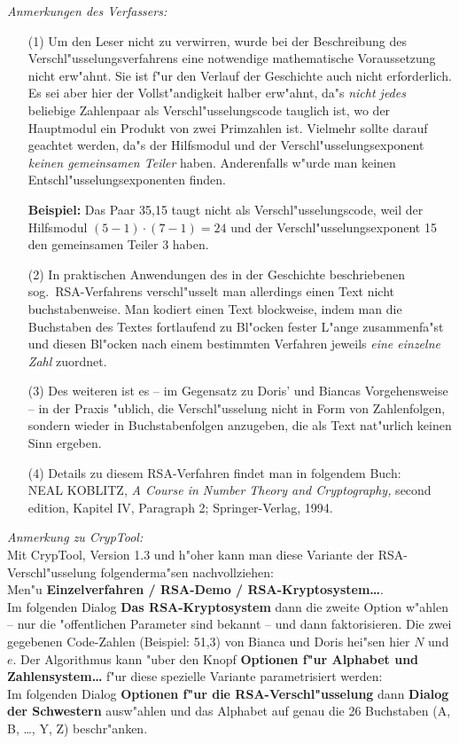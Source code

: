 \[\]
\[\]
\[\]
\[\]
\hrulefill
\[\]
\[\]
\emph{Anmerkungen des Verfassers:}
\begin{itemize}
\item[(1)] Um den Leser nicht zu verwirren, wurde bei der Beschreibung des
  Verschl"usselungsverfahrens eine notwendige mathematische Voraussetzung
  nicht erw"ahnt. Sie ist f"ur den Verlauf der Geschichte auch nicht
  erforderlich. Es sei aber hier der Vollst"andigkeit halber erw"ahnt, da"s
  \emph{nicht jedes} beliebige Zahlenpaar als Verschl"usselungscode
  tauglich ist, wo der Hauptmodul ein Produkt von zwei Primzahlen
  ist. Vielmehr sollte darauf geachtet werden, da"s der Hilfsmodul und der
  Verschl"usselungsexponent \emph{keinen gemeinsamen Teiler}
  haben. Anderenfalls w"urde man keinen Entschl"usselungsexponenten finden.

  \textbf{Beispiel:} Das Paar 35,15 taugt nicht als Verschl"usselungscode,
  weil der Hilfsmodul $(5-1)\cdot(7-1)=24$ und der
  Verschl"usselungsexponent 15 den gemeinsamen Teiler 3 haben.
\item[(2)] In praktischen Anwendungen des in der Geschichte beschriebenen
  sog.\ RSA-Verfahrens verschl"usselt man allerdings einen Text nicht
  buchstabenweise. Man kodiert einen Text blockweise, indem man die
  Buchstaben des Textes fortlaufend zu Bl"ocken fester L"ange zusammenfa"st
  und diesen Bl"ocken nach einem bestimmten Verfahren jeweils \emph{eine
    einzelne Zahl} zuordnet.
\item[(3)] Des weiteren ist es -- im Gegensatz zu Doris' und Biancas
  Vorgehensweise -- in der Praxis "ublich, die Verschl"usselung nicht in
  Form von Zahlenfolgen, sondern wieder in Buchstabenfolgen anzugeben, die
  als Text nat"urlich keinen Sinn ergeben.
\item[(4)] Details zu diesem RSA-Verfahren findet man in folgendem Buch:\\
  NEAL KOBLITZ, \emph{A Course in Number Theory and Cryptography,} second
  edition, Kapitel IV, Paragraph 2; Springer-Verlag, 1994.
\end{itemize}

\vspace{2cm}

\noindent\emph{Anmerkung zu CrypTool:}
\\
Mit CrypTool, Version 1.3 und h"oher kann man diese Variante der
RSA-Verschl"usselung folgenderma"sen nachvollziehen:
\\
Men"u \textbf{Einzelverfahren / RSA-Demo / RSA-Kryptosystem\dots}.
\\
Im folgenden Dialog \textbf{Das RSA-Kryptosystem} dann die zweite Option w"ahlen --
nur die "offentlichen Parameter sind bekannt -- und dann faktorisieren. Die
zwei gegebenen Code-Zahlen (Beispiel: 51,3) von Bianca und Doris hei"sen hier
$N$ und $e$. Der Algorithmus kann "uber den Knopf \textbf{Optionen f"ur
Alphabet und Zahlensystem\dots} f"ur diese spezielle Variante
parametrisiert werden: \\
Im folgenden Dialog \textbf{Optionen f"ur die
RSA-Verschl"usselung} dann \textbf{Dialog der Schwestern} ausw"ahlen und
das Alphabet auf genau die 26 Buchstaben (A, B, \dots, Y, Z) beschr"anken.


